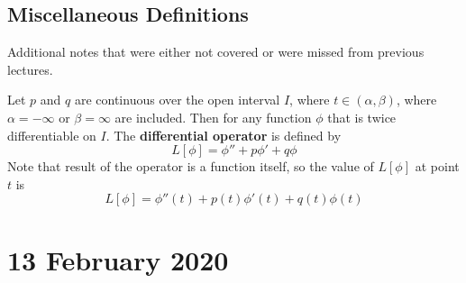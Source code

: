 \documentclass[twoside]{report}
\begin{document}
    \section{Miscellaneous Definitions}
    Additional notes that were either not covered or were missed from previous lectures.
    \begin{definition}
        Let $p$ and $q$ are continuous over the open interval $I$, where $t\in(\alpha, \beta)$, where $\alpha = -\infty$ or $\beta = \infty$ are included. Then for any function $\phi$ that is twice differentiable on $I$.
        The \textbf{differential operator} is defined by
        \begin{equation}
            L[\phi] = \phi'' + p\phi' + q\phi
        \end{equation}
        Note that result of the operator is a function itself, so the value of $L[\phi]$ at point $t$ is
        \begin{equation}
            L[\phi] = \phi''(t) + p(t)\phi'(t) + q(t)\phi(t)
        \end{equation}
    \end{definition}
    \chapter{13 February 2020}
\end{document}
